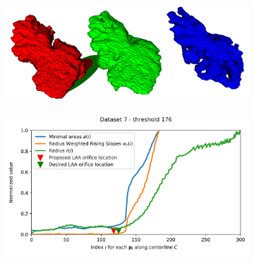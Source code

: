 \documentclass[review]{elsarticle}
\begin{document}
\begin{figure}[]
  \begin{subfigure}[]{.5\linewidth}
    \centering
    \includegraphics[width=\textwidth]{fig14middleleft.png}
  \end{subfigure}%
  \begin{subfigure}[]{.5\linewidth}
    \centering
    \includegraphics[width=\textwidth]{fig14middleright.png}
  \end{subfigure}%


\end{figure}
\end{document}
